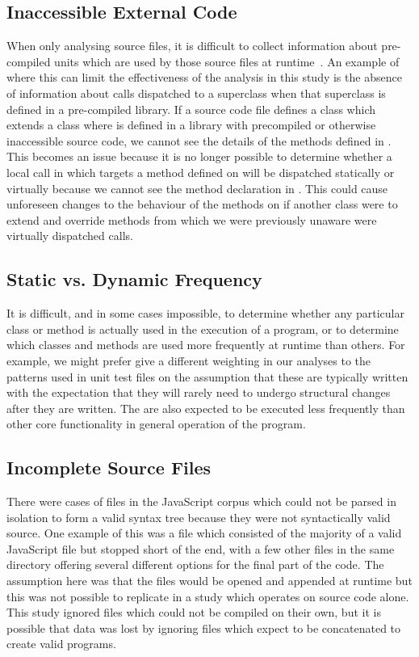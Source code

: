 \subsection{Inaccessible External Code}
\label{InaccessibleCode}
When only analysing source files, it is difficult to collect information about pre-compiled units which are used by those source files at runtime~\cite{StaticAnalysisLimits}. An example of where this can limit the effectiveness of the analysis in this study is the absence of information about calls dispatched to a superclass when that superclass is defined in a pre-compiled library. If a source code file defines a class  which extends a class  where  is defined in a library with precompiled or otherwise inaccessible source code, we cannot see the details of the methods defined in . This becomes an \textsl{}issue because it is no longer possible to determine whether a local call in  which targets a method defined on  will be dispatched statically or virtually because we cannot see the method declaration in . This could cause unforeseen changes to the behaviour of the methods on  if another class  were to extend  and override methods from  which we were previously unaware were virtually dispatched calls.

\subsection{Static vs. Dynamic Frequency}
It is difficult, and in some cases impossible, to determine whether any particular class or method is actually used in the execution of a program, or to determine which classes and methods are used more frequently at runtime than others. For example, we might prefer give a different weighting in our analyses to the patterns used in unit test files on the assumption that these are typically written with the expectation that they will rarely need to undergo structural changes after they are written. The are also expected to be executed less frequently than other core functionality in general operation of the program.

\subsection{Incomplete Source Files}
There were cases of files in the JavaScript corpus which could not be parsed in isolation to form a valid syntax tree because they were not syntactically valid source. One example of this was a file which consisted of the majority of a valid JavaScript file but stopped short of the end, with a few other files in the same directory offering several different options for the final part of the code. The assumption here was that the files would be opened and appended at runtime but this was not possible to replicate in a study which operates on source code alone. This study ignored files which could not be compiled on their own, but it is possible that data was lost by ignoring files which expect to be concatenated to create valid programs.

